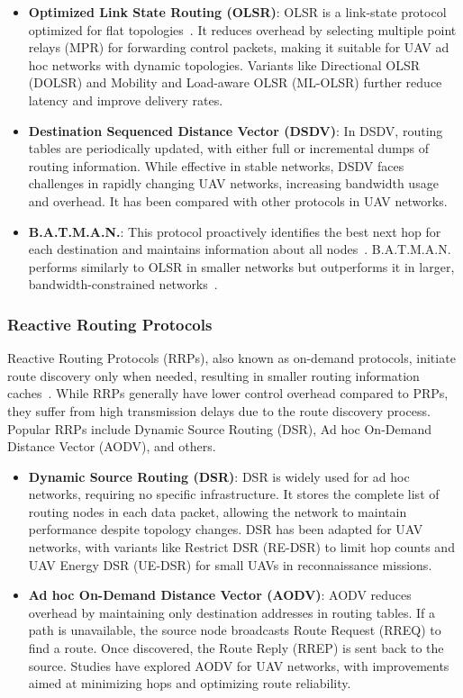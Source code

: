 \begin{itemize}
    \item \textbf{Optimized Link State Routing (OLSR)}: OLSR is a link-state protocol optimized for flat topologies~\cite{singh2015experimental}. It reduces overhead by selecting multiple point relays (MPR) for forwarding control packets, making it suitable for UAV ad hoc networks with dynamic topologies. Variants like Directional OLSR (DOLSR) and Mobility and Load-aware OLSR (ML-OLSR) further reduce latency and improve delivery rates.
    
    \item \textbf{Destination Sequenced Distance Vector (DSDV)}: In DSDV, routing tables are periodically updated, with either full or incremental dumps of routing information. While effective in stable networks, DSDV faces challenges in rapidly changing UAV networks, increasing bandwidth usage and overhead. It has been compared with other protocols in UAV networks.
    
    \item \textbf{B.A.T.M.A.N.}: This protocol proactively identifies the best next hop for each destination and maintains information about all nodes~\cite{sandhu2012performance}. B.A.T.M.A.N. performs similarly to OLSR in smaller networks but outperforms it in larger, bandwidth-constrained networks~\cite{sandhu2012performance}.
\end{itemize}



\subsubsection{Reactive Routing Protocols}

Reactive Routing Protocols (RRPs), also known as on-demand protocols, initiate route discovery only when needed, resulting in smaller routing information caches~\cite{Chen2020}. While RRPs generally have lower control overhead compared to PRPs, they suffer from high transmission delays due to the route discovery process. Popular RRPs include Dynamic Source Routing (DSR), Ad hoc On-Demand Distance Vector (AODV), and others.

\begin{itemize}
    \item \textbf{Dynamic Source Routing (DSR)}: DSR is widely used for ad hoc networks, requiring no specific infrastructure. It stores the complete list of routing nodes in each data packet, allowing the network to maintain performance despite topology changes. DSR has been adapted for UAV networks, with variants like Restrict DSR (RE-DSR) to limit hop counts and UAV Energy DSR (UE-DSR) for small UAVs in reconnaissance missions.
    
    \item \textbf{Ad hoc On-Demand Distance Vector (AODV)}: AODV reduces overhead by maintaining only destination addresses in routing tables. If a path is unavailable, the source node broadcasts Route Request (RREQ) to find a route. Once discovered, the Route Reply (RREP) is sent back to the source. Studies have explored AODV for UAV networks, with improvements aimed at minimizing hops and optimizing route reliability.
\end{itemize}



